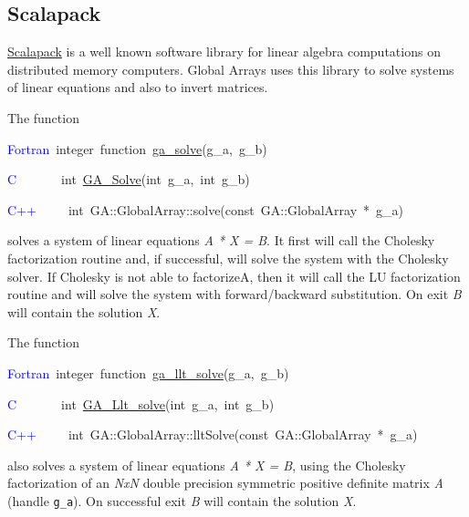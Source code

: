 \subsection{Scalapack }

\href{http://www.netlib.org/scalapack/index.html}{Scalapack} is a
well known software library for linear algebra computations on distributed
memory computers. Global Arrays uses this library to solve systems
of linear equations and also to invert matrices.

The function
\begin{lyxcode}
\textcolor{blue}{Fortran}~integer~function~\href{http://www.emsl.pnl.gov/docs/global/ga_ops.html\#ga_solve}{ga\_{}solve}(g\_a,~g\_b)

\textcolor{blue}{C}~~~~~~~int~\href{http://www.emsl.pnl.gov/docs/global/c_nga_ops.html\#ga_solve}{GA\_{}Solve}(int~g\_a,~int~g\_b)~

\textcolor{blue}{C++}~~~~~int~GA::GlobalArray::solve(const~GA::GlobalArray~{*}~g\_a)
\end{lyxcode}
solves a system of linear equations \emph{A {*} X = B}. It first will
call the Cholesky factorization routine and, if successful, will solve
the system with the Cholesky solver. If Cholesky is not able to factorizeA,
then it will call the LU factorization routine and will solve the
system with forward/backward substitution. On exit \emph{B} will contain
the solution \emph{X}.

The function
\begin{lyxcode}
\textcolor{blue}{Fortran}~integer~function~\href{http://www.emsl.pnl.gov/docs/global/ga_ops.html\#ga_llt_solve}{ga\_{}llt\_{}solve}(g\_a,~g\_b)

\textcolor{blue}{C}~~~~~~~int~\href{http://www.emsl.pnl.gov/docs/global/c_nga_ops.html\#ga_llt_solve}{GA\_{}Llt\_{}solve}(int~g\_a,~int~g\_b)

\textcolor{blue}{C++}~~~~~int~GA::GlobalArray::lltSolve(const~GA::GlobalArray~{*}~g\_a)
\end{lyxcode}
also solves a system of linear equations \emph{A {*} X = B}, using
the Cholesky factorization of an \emph{NxN} double precision symmetric
positive definite matrix \emph{A} (handle \texttt{g\_a}). On successful
exit \emph{B} will contain the solution \emph{X}.

